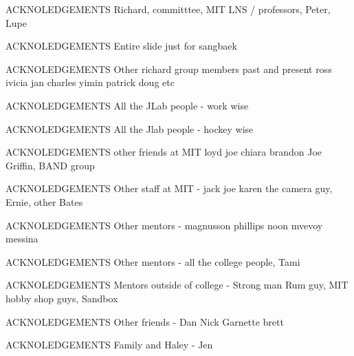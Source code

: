 \documentclass[aspectratio=169]{beamer}
\begin{document}
\appendix

\begin{frame}{ACKNOLEDGEMENTS}
Richard, committtee, MIT LNS / professors, Peter, Lupe 
\end{frame}

\begin{frame}{ACKNOLEDGEMENTS}
Entire slide just for sangbaek
\end{frame}
\begin{frame}{ACKNOLEDGEMENTS}
Other richard group members past and present ross ivicia jan charles yimin patrick doug etc
\end{frame}

\begin{frame}{ACKNOLEDGEMENTS}
All the JLab people - work wise
\end{frame}

\begin{frame}{ACKNOLEDGEMENTS}
All the Jlab people - hockey wise
\end{frame}


\begin{frame}{ACKNOLEDGEMENTS}
other friends at MIT loyd joe chiara brandon Joe Griffin, BAND group
\end{frame}

\begin{frame}{ACKNOLEDGEMENTS}
Other staff at MIT - jack joe karen the camera guy, Ernie, other Bates
\end{frame}

\begin{frame}{ACKNOLEDGEMENTS}
Other mentors - magnusson phillips noon mvevoy messina
\end{frame}

\begin{frame}{ACKNOLEDGEMENTS}
Other mentors - all the college people, Tami
\end{frame}

\begin{frame}{ACKNOLEDGEMENTS}
Mentors outside of college - Strong man Rum guy, MIT hobby shop guys, Sandbox
\end{frame}

\begin{frame}{ACKNOLEDGEMENTS}
Other friends - Dan Nick Garnette brett
\end{frame}

\begin{frame}{ACKNOLEDGEMENTS}
Family and Haley - Jen 
\end{frame}
\end{document}

